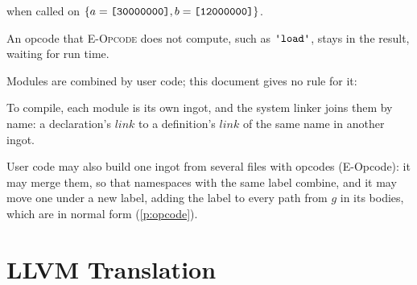 \documentclass[11pt,letterpaper]{article}
\newcommand{\rn}[1]{\textsc{#1}}                %
\newcommand{\str}[1]{\text{\ttfamily\textquotesingle #1\textquotesingle}}  %
\newcommand{\hex}[1]{\text{\ttfamily [#1]}}  %
\newcommand{\pref}[1]{\ref{#1}}  %
\begin{document}
\begin{points}
\begin{subpoints}
    when called on $\{a = \hex{30000000}, b = \hex{12000000}\}$.
  \item An opcode that \rn{E-Opcode} does not compute, such as $\str{load}$, stays in the result, waiting for
    run time.
  \end{subpoints}
\item\label{p:merge} Modules are combined by user code; this document gives no rule for it:
  \begin{subpoints}
  \item To compile, each module is its own ingot, and the system linker joins them by name: a declaration's
    $\mathit{link}$ to a definition's $\mathit{link}$ of the same name in another ingot.
  \item User code may also build one ingot from several files with opcodes (E-Opcode): it may merge them,
    so that namespaces with the same label combine, and it may move one under a new label, adding the label
    to every path from $g$ in its bodies, which are in normal form (\pref{p:opcode}).
  \end{subpoints}
\end{points}


\section{LLVM Translation}\label{sec:llvm}
\end{document}
